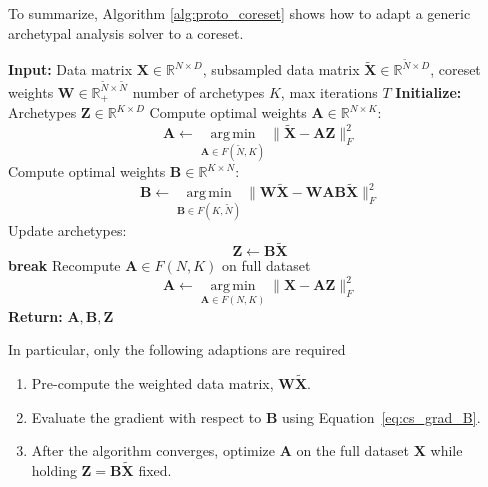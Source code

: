 \documentclass{article}
\begin{document}
To summarize, Algorithm \ref{alg:proto_coreset} shows how to adapt a generic archetypal analysis solver to a coreset.

\begin{algorithm}[H]
    \caption{Prototypical Algorithm Optimization using Coreset}
    \label{alg:proto_coreset}
    \begin{algorithmic}[1]
    \State \textbf{Input:} Data matrix $\mathbf{X} \in \mathbb{R}^{N \times D}$, subsampled data matrix $\tilde{\mathbf{X}} \in \mathbb{R}^{\tilde{N} \times D}$, coreset weights $\mathbf{W} \in \mathbb{R}_+^{\tilde{N} \times \tilde{N}}$ number of archetypes $K$, max iterations $T$
    \State \textbf{Initialize:} Archetypes $\mathbf{Z} \in \mathbb{R}^{K \times D}$
        \State Compute optimal weights $\mathbf{A} \in \mathbb{R}^{N \times K}$:
        \begin{equation}
        \mathbf{A} \gets \operatorname*{arg\,min}_{\mathbf{A} \in F(\tilde{N}, K)} \| \tilde{\mathbf{X}} - {\mathbf{A}} \mathbf{Z} \|_F^2
        \end{equation}
        \State Compute optimal weights $\mathbf{B} \in \mathbb{R}^{K \times N}$:
        \begin{equation}
        \mathbf{B} \gets \operatorname*{arg\,min}_{\mathbf{B} \in F(K, \tilde{N})} \| \mathbf{W} \tilde{\mathbf{X}} - \mathbf{W} \mathbf{A} \mathbf{B} \tilde{\mathbf{X}} \|_F^2
        \end{equation}
        \State Update archetypes:
        \begin{equation}
        \mathbf{Z} \gets \mathbf{B} \tilde{\mathbf{X}}
        \end{equation}
            \State \textbf{break}
        \EndIf
    \EndFor
    \State Recompute $\mathbf{A} \in F(N, K)$ on full dataset
    \begin{equation}
    \mathbf{A} \gets \operatorname*{arg\,min}_{\mathbf{A} \in F(N, K)} \| \mathbf{X} - {\mathbf{A}} \mathbf{Z} \|_F^2
    \end{equation}
    \State \textbf{Return:} $\mathbf{A}, \mathbf{B}, \mathbf{Z}$
    \end{algorithmic}
\end{algorithm}

In particular, only the following adaptions are required

\begin{enumerate}
    \item Pre-compute the weighted data matrix, $\mathbf{W} \tilde{\mathbf{X}}$.
    \item Evaluate the gradient with respect to $\mathbf{B}$ using Equation~\eqref{eq:cs_grad_B}.
    \item After the algorithm converges, optimize $\mathbf{A}$ on the full dataset $\mathbf{X}$ while holding $\mathbf{Z}=\mathbf{B} \tilde{\mathbf{X}}$ fixed.
\end{enumerate}
\end{document}
